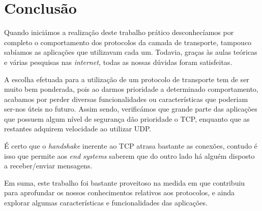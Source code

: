 \section{Conclusão}

    Quando iniciámos a realização deste trabalho prático desconhecíamos por completo o comportamento dos protocolos da camada de transporte, tampouco sabíamos as aplicações que utilizavam cada um. Todavia, graças às aulas teóricas e várias pesquisas nas \textit{internet,} todas as nossas dúvidas foram satisfeitas.

    A escolha efetuada para a utilização de um protocolo de transporte tem de ser muito bem ponderada, pois ao darmos prioridade a determinado comportamento, acabamos por perder diversas funcionalidades ou características que poderiam ser-nos úteis no futuro. Assim sendo, verificámos que grande parte das aplicações que possuem algum nível de segurança dão prioridade o TCP, enquanto que as restantes adquirem velocidade ao utilizar UDP.

    É certo que o \textit{handshake} inerente ao TCP atrasa bastante as conexões, contudo é isso que permite aos \textit{end systems} saberem que do outro lado há alguém disposto a receber/enviar mensagens.

    Em suma, este trabalho foi bastante proveitoso na medida em que contribuiu para aprofundar os nossos conhecimentos relativos aos protocolos, e ainda explorar algumas características e funcionalidades das aplicações. 